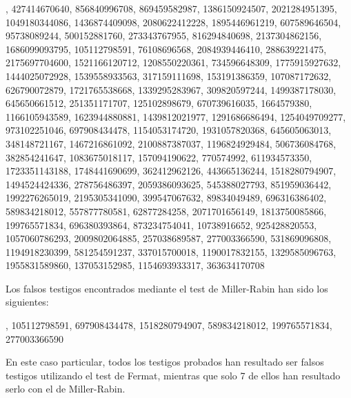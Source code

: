 \documentclass[11pt,a4paper]{article}
\begin{document}
, 427414670640, 856840996708, 869459582987, 1386150924507, 2021284951395, 1049180344086, 1436874409098, 2080622412228, 1895446961219, 607589646504, 95738089244, 500152881760, 273343767955, 816294840698, 2137304862156, 1686099093795, 105112798591, 76108696568, 2084939446410, 288639221475, 2175697704600, 1521166120712, 1208550220361, 734596648309, 1775915927632, 1444025072928, 1539558933563, 317159111698, 153191386359, 107087172632, 626790072879, 1721765538668, 1339295283967, 309820597244, 1499387178030, 645650661512, 251351171707, 125102898679, 670739616035, 1664579380, 1166105943589, 1623944880881, 1439812021977, 1291686686494, 1254049709277, 973102251046, 697908434478, 1154053174720, 1931057820368, 645605063013, 348148721167, 1467216861092, 2100887387037, 1196824929484, 506736084768, 382854241647, 1083675018117, 157094190622, 770574992, 611934573350, 1723351143188, 1748441690699, 362412962126, 443665136244, 1518280794907, 1494524424336, 278756486397, 2059386093625, 545388027793, 851959036442, 1992276265019, 2195305341090, 399547067632, 89834049489, 696316386402, 589834218012, 557877780581, 62877284258, 2071701656149, 1813750085866, 199765571834, 696380393864, 873234754041, 10738916652, 925428820553, 1057060786293, 2009802064885, 257038689587, 277003366590, 531869096808, 1194918230399, 581254591237, 337015700018, 1190017832155, 1329585096763, 1955831589860, 137053152985, 1154693933317, 363634170708

Los falsos testigos encontrados mediante el test de Miller-Rabin han sido los siguientes:

, 105112798591, 697908434478, 1518280794907, 589834218012, 199765571834, 277003366590

En este caso particular, todos los testigos probados han resultado ser falsos testigos utilizando
el test de Fermat, mientras que solo 7 de ellos han resultado serlo con el de Miller-Rabin.
\end{document}
